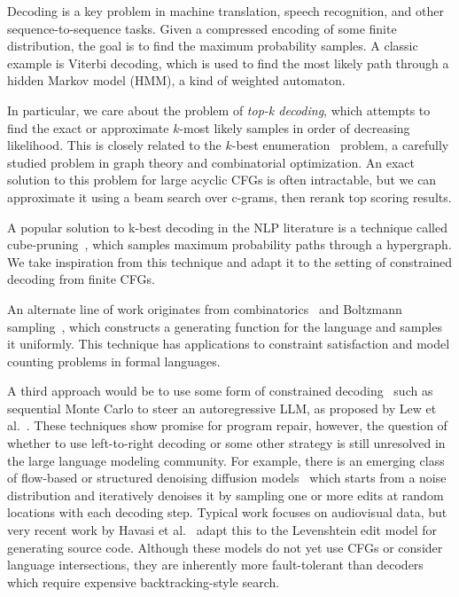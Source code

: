\documentclass[sigplan,review,acmsmall,nonacm,screen,anonymous]{acmart}\settopmatter{printfolios=false,printccs=false,printacmref=false}
\begin{document}
Decoding is a key problem in machine translation, speech recognition, and other sequence-to-sequence tasks. Given a compressed encoding of some finite distribution, the goal is to find the maximum probability samples. A classic example is Viterbi decoding, which is used to find the most likely path through a hidden Markov model (HMM), a kind of weighted automaton.

In particular, we care about the problem of \textit{top-k decoding}, which attempts to find the exact or approximate $k$-most likely samples in order of decreasing likelihood. This is closely related to the $k$-best enumeration~\cite{eppstein2014k} problem, a carefully studied problem in graph theory and combinatorial optimization. An exact solution to this problem for large acyclic CFGs is often intractable, but we can approximate it using a beam search over c-grams, then rerank top scoring results.

A popular solution to k-best decoding in the NLP literature is a technique called cube-pruning~\cite{huang2005better, chiang2007hierarchical}, which samples maximum probability paths through a hypergraph. We take inspiration from this technique and adapt it to the setting of constrained decoding from finite CFGs.

An alternate line of work originates from combinatorics~\cite{hickey1983uniform} and Boltzmann sampling~\cite{duchon2004boltzmann}, which constructs a generating function for the language and samples it uniformly. This technique has applications to constraint satisfaction and model counting problems in formal languages.

A third approach would be to use some form of constrained decoding~\cite{willard2023efficient, ugare2024improving, loula2025syntactic} such as sequential Monte Carlo to steer an autoregressive LLM, as proposed by Lew et al.~\cite{lew2023sequential}. These techniques show promise for program repair, however, the question of whether to use left-to-right decoding or some other strategy is still unresolved in the large language modeling community. For example, there is an emerging class of flow-based or structured denoising diffusion models~\cite{austin2021structured} which starts from a noise distribution and iteratively denoises it by sampling one or more edits at random locations with each decoding step. Typical work focuses on audiovisual data, but very recent work by Havasi et al.~\cite{havasi2025edit} adapt this to the Levenshtein edit model for generating source code. Although these models do not yet use CFGs or consider language intersections, they are inherently more fault-tolerant than decoders which require expensive backtracking-style search.
\end{document}
